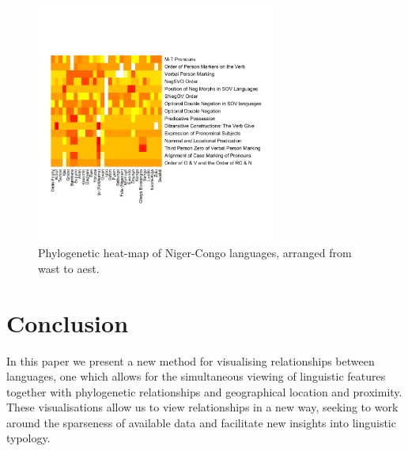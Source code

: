 \documentclass[11pt]{article}
\begin{document}
\begin{figure}[ht!]
\includegraphics[width=3.1in]
{graph3nigercongosmall.pdf} 
\caption{Phylogenetic heat-map of Niger-Congo languages, arranged from wast to aest.} 
\label{fig:heat2} 
\end{figure}


%
%
%


\section{Conclusion}
In this paper we present a new method for visualising relationships between languages, one which allows for the simultaneous viewing of linguistic features together with phylogenetic relationships and geographical location and proximity. These visualisations allow us to view relationships in a new way, seeking to work around the sparseness of available data and facilitate new insights into linguistic typology.
\end{document}
